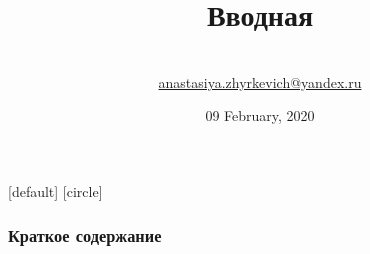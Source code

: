 \documentclass[10pt]{beamer}
\title[Дискретная математика]{Вводная}
\theoremstyle{remark}
\theoremstyle{definition}
\begin{document}
\author[BSU]{
	\begin{tabular}{c} 
	\Large
	\\
    \footnotesize \href{mailto:anastasiya.zhyrkevich@yandex.ru}{anastasiya.zhyrkevich@yandex.ru}
\end{tabular}
\vspace{-4ex}}


\date{09 February, 2020}

\begin{noheadline}
\begin{frame}\maketitle\end{frame}
\end{noheadline}

[default]
[circle]

\begin{frame}
	\frametitle{Краткое содержание} %
	\tableofcontents %
\end{frame}
\end{document}
